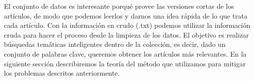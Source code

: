 El conjunto de datos es interesante porqué provee las versiones cortas de los artículos, de modo que podemos leerlos y darnos una idea rápida de lo que trata cada artículo. Con la información en crudo (.txt) podemos utilizar la información cruda  para hacer el proceso desde la limpieza de los datos. El objetivo es realizar búsquedas temáticas inteligentes dentro de la colección, es decir, dado un conjunto de palabras clave, queremos obtener los artículos más relevantes. En la siguiente sección describiremos la teoría del método que utilizamos para mitigar los problemas descritos anteriormente.


